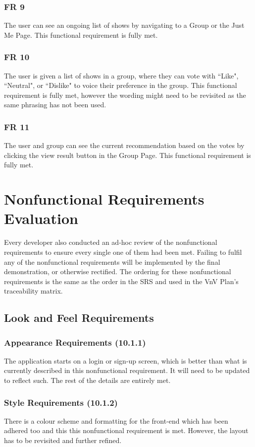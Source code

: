 \documentclass[12pt, titlepage]{article}
\begin{document}
\subsubsection{FR 9}
The user can see an ongoing list of shows by navigating to a Group or the Just Me Page. This functional requirement is fully met.

\subsubsection{FR 10}
The user is given a list of shows in a group, where they can vote with ``Like", ``Neutral", or ``Dislike" to voice their preference in the group. This functional requirement is fully met, however the wording might need to be revisited as the same phrasing has not been used.

\subsubsection{FR 11}
The user and group can see the current recommendation based on the votes by clicking the view result button in the Group Page. This functional requirement is fully met.

\section{Nonfunctional Requirements Evaluation}
Every developer also conducted an ad-hoc review of the nonfunctional requirements to ensure every single one of them had been met. Failing to fulfil any of the nonfunctional requirements will be implemented by the final demonstration, or otherwise rectified. The ordering for these nonfunctional requirements is the same as the order in the SRS and used in the VnV Plan's traceability matrix.

\subsection{Look and Feel Requirements}
\subsubsection{Appearance Requirements (10.1.1)}
The application starts on a login or sign-up screen, which is better than what is currently described in this nonfunctional requirement. It will need to be updated to reflect such. The rest of the details are entirely met.

\subsubsection{Style Requirements (10.1.2)}
There is a colour scheme and formatting for the front-end which has been adhered too and this this nonfunctional requirement is met. However, the layout has to be revisited and further refined.
\end{document}
